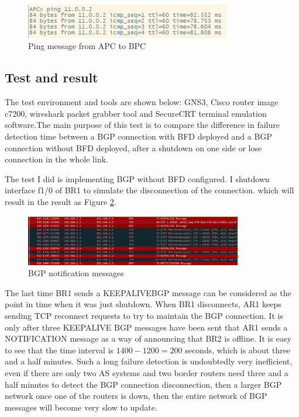 \documentclass[12pt]{article}
\begin{document}
\begin{figure}[h]
    \centering
    \includegraphics[width=0.8\textwidth,keepaspectratio]{Graph/ping msg.png}
    \caption{Ping message from APC to BPC} 
    \label{fig:Ping message from APC to BPC} 
\end{figure}


\subsection{Test and result}
The test environment and tools are shown below: GNS3, Cisco router image c7200, wireshark packet grabber tool and SecureCRT terminal emulation software.The main purpose of this test is to compare the difference in failure detection time between a BGP connection with BFD deployed and a BGP connection without BFD deployed, after a shutdown on one side or lose connection in the whole link.

The test I did is implementing BGP without BFD configured. I shutdown interface f1/0 of BR1 to simulate the disconnection of the connection. which will result in the result as Figure \ref{fig:BGP notification messages}. 

\begin{figure}[h]
    \centering
    \includegraphics[width=0.85\textwidth,keepaspectratio]{Graph/BGP notification msg.png}
    \caption{BGP notification messages} 
    \label{fig:BGP notification messages} 
\end{figure}

The last time BR1 sends a KEEPALIVEBGP message can be considered as the point in time when it was just shutdown. When BR1 disconnects, AR1 keeps sending TCP reconnect requests to try to maintain the BGP connection. It is only after three KEEPALIVE BGP messages have been sent that AR1 sends a NOTIFICATION message as a way of announcing that BR2 is offline. It is easy to see that the time interval is \textit{$1400-1200 = 200$} seconds, which is about three and a half minutes. Such a long failure detection is undoubtedly very inefficient, even if there are only two AS systems and two border routers need three and a half minutes to detect the BGP connection disconnection, then a larger BGP network once one of the routers is down, then the entire network of BGP messages will become very slow to update.
\end{document}
